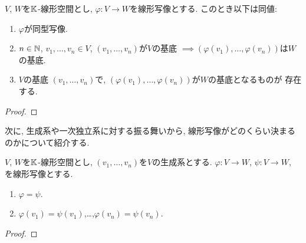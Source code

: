 \begin{prop}
  $V$, $W$を$\mathbb{K}$-線形空間とし,
  $\varphi\colon V\to W$を線形写像とする.
  このとき以下は同値:
  \begin{enumerate}
  \item $\varphi$が同型写像.
  \item $n\in \mathbb{N}$, $v_1,\ldots,v_n\in V$,
    $(v_1,\ldots,v_n)$が$V$の基底
    $\implies (\varphi(v_1),\ldots,\varphi(v_n))$は$W$の基底.
  \item $V$の基底
    $(v_1,\ldots,v_n)$で,
    $(\varphi(v_1),\ldots,\varphi(v_n))$が$W$の基底となるものが
    存在する.
  \end{enumerate}
\end{prop}
\begin{proof}\end{proof}

次に,
生成系や一次独立系に対する振る舞いから,
線形写像がどのくらい決まるのかについて紹介する.


\begin{prop}
  $V$, $W$を$\mathbb{K}$-線形空間とし,
  $(v_1,\ldots,v_n)$を$V$の生成系とする.
  $\varphi\colon V\to W$,
  $\psi\colon V\to W$,
  を線形写像とする.
  \begin{enumerate}
  \item $\varphi=\psi$.
  \item $\varphi(v_1)=\psi(v_1)$,\ldots,$\varphi(v_n)=\psi(v_n)$.
  \end{enumerate}
\end{prop}
\begin{proof}\end{proof}

